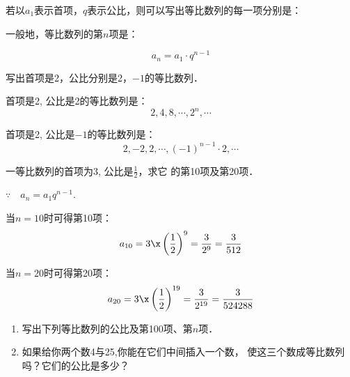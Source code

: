 若以$a_1$表示首项，$q$表示公比，则可以写出等比数列的每一项分别是：
\begin{center}
   \end{center}

一般地，等比数列的第$n$项是：
\begin{blk}{}
    \[a_n=a_1\cdot q^{n-1}\]
\end{blk}


\begin{example}
写出首项是2，公比分别是2，$-1$的等比数列．
\end{example}

\begin{solution}
首项是2, 公比是2的等比数列是：
\[2, 4, 8, \cdots , 2^n, \cdots \]

首项是2, 公比是$-1$的等比数列是：
\[2, -2, 2, \cdots, (-1)^{n-1}\cdot 2,\cdots\]
\end{solution}

\begin{example}
    一等比数列的首项为3, 公比是$\frac{1}{2}$，求它
的第10项及第20项．
\end{example}

\begin{solution}
   $\because\quad  a_n=a_1q^{n-1}$.

当$n=10$时可得第10项：
\[a_{10}=3\x\left(\frac{1}{2}\right)^9=\frac{3}{2^9}=\frac{3}{512}\]

当$n=20$时可得第20项：
\[a_{20}=3\x\left(\frac{1}{2}\right)^{19}=\frac{3}{2^{19}}=\frac{3}{524288}\]
\end{solution}


\begin{ex}
\begin{enumerate}
    \item 写出下列等比数列的公比及第100项、第$n$项．
    \begin{enumerate}

    \end{enumerate}

    \item 如果给你两个数4与25,你能在它们中间插入一个数，
    使这三个数成等比数列吗？它们的公比是多少？
\end{enumerate}    
\end{ex}

